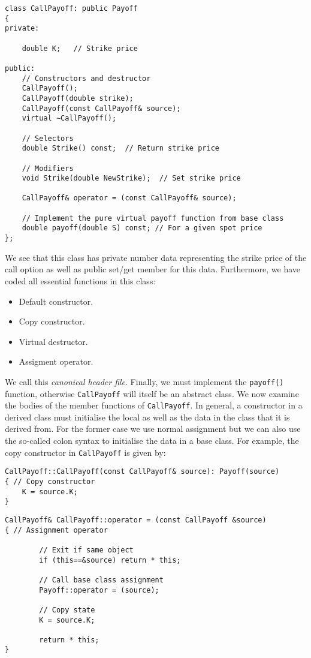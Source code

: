 \begin{lstlisting}
class CallPayoff: public Payoff
{
private:

	double K;	// Strike price

public:
	// Constructors and destructor
	CallPayoff();
	CallPayoff(double strike);
	CallPayoff(const CallPayoff& source);
	virtual ∼CallPayoff();

	// Selectors
	double Strike() const;	// Return strike price

	// Modifiers
	void Strike(double NewStrike);	// Set strike price

	CallPayoff& operator = (const CallPayoff& source);

	// Implement the pure virtual payoff function from base class
	double payoff(double S) const; // For a given spot price
};
\end{lstlisting}

We see that this class has private number data representing the strike price of the call option as well as public set/get member for this data. Furthermore, we have coded all essential functions in this class:
\begin{itemize}
	\item Default constructor.
	\item Copy constructor.
	\item Virtual destructor.
	\item Assigment operator.
\end{itemize}
We call this \emph{canonical header file}. Finally, we must implement the \texttt{payoff()} function, otherwise \texttt{CallPayoff} will itself be an abstract class.
We now examine the bodies of the member functions of \texttt{CallPayoff}. In general, a constructor in a derived class must initialise the local as well as the data in the class that it is derived from. For the former case we use normal assignment but we can also use the so-called colon syntax to initialise the data in a base class. For example, the copy constructor in \texttt{CallPayoff} is given by:

\begin{lstlisting}
CallPayoff::CallPayoff(const CallPayoff& source): Payoff(source)
{ // Copy constructor
	K = source.K;
}
\end{lstlisting}

\begin{lstlisting}
CallPayoff& CallPayoff::operator = (const CallPayoff &source)
{ // Assignment operator

		// Exit if same object
		if (this==&source) return * this;

		// Call base class assignment
		Payoff::operator = (source);

		// Copy state
		K = source.K;

		return * this;
}
\end{lstlisting}

